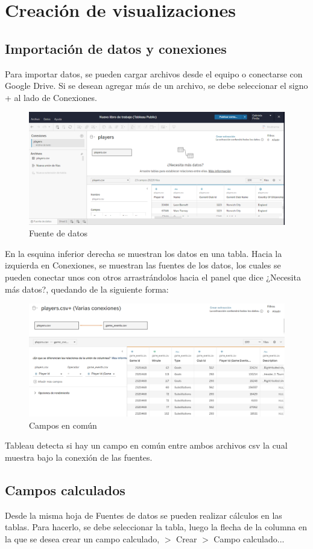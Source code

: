 \documentclass[a4paper, 12pt]{book}
\begin{document}
\section{Creación de visualizaciones}
\subsection{Importación de datos y conexiones}
Para importar datos, se pueden cargar archivos desde el equipo o conectarse con Google Drive. Si se desean agregar más de un archivo, se debe seleccionar el signo + al lado de Conexiones.
\begin{figure}[H] 
	\centering 
	\includegraphics[width=1.0\linewidth]{foto1.png}
	\caption{Fuente de datos}
\end{figure}
En la esquina inferior derecha se muestran los datos en una tabla. Hacia la izquierda en Conexiones, se muestran las fuentes de los datos, los cuales se pueden conectar unos con otros arrastrándolos hacia el panel que dice ¿Necesita más datos?, quedando de la siguiente forma:
\begin{figure}[H] 
	\centering 
	\includegraphics[width=1.0\linewidth]{foto2.png}
	\caption{Campos en común}
\end{figure}
Tableau detecta si hay un campo en común entre ambos archivos csv la cual muestra bajo la conexión de las fuentes.
\subsection{Campos calculados}
Desde la misma hoja de Fuentes de datos se pueden realizar cálculos en las tablas. Para hacerlo, se debe seleccionar la tabla, luego la flecha de la columna en la que se desea crear un campo calculado, $>$ Crear $>$ Campo calculado...
\end{document}
